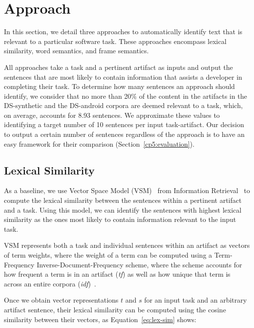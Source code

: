 \section{Approach}
\label{cp5:approaches}

In this section, we detail three approaches to automatically identify text that is relevant to a particular software task.
These approaches encompass lexical similarity, word semantics, and frame semantics.



All approaches take a task and a pertinent artifact as inputs and output the sentences 
that are most likely to contain information that assists a developer in completing their task. 
To determine how many sentences an approach should identify, we consider that 
no more than 20\% of the content in the artifacts in the
 \acs{DS-synthetic} and the \acs{DS-android} corpora are deemed relevant to a task, which, on average, accounts for 8.93 sentences. 
We approximate these values to identifying a target number of 10 sentences per input task-artifact. 
Our decision to output a certain number of sentences regardless of the approach is to have an easy framework for their comparison (Section~\ref{cp5:evaluation}).



\subsection{Lexical Similarity}

As a baseline, we use Vector Space Model (VSM)~\cite{Salton1975vsm} from Information Retrieval~\cite{Manning2009IR}
to compute the lexical similarity between the sentences within a pertinent artifact and a task. 
Using this model, we can identify the sentences with highest lexical similarity 
as the ones most likely to contain information relevant to the input task.




VSM represents both a task and individual sentences within an artifact as vectors of term weights,
where the weight of a term
can be computed using a Term-Frequency Inverse-Document-Frequency scheme, where the scheme accounts for how frequent a term is in an artifact (\textit{tf}) as well as how 
unique that term is across an entire corpora (\textit{idf})~\cite{Manning2009IR}. 



Once we obtain vector representations $t$ and $s$ 
for an input task and an arbitrary artifact sentence, 
their lexical similarity can be computed 
using the cosine similarity between their vectors, as Equation~\ref{eq:lex-sim} shows:



